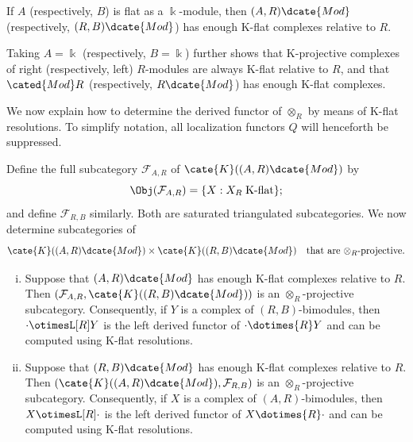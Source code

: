 \begin{corollary}\label{prop:enough-K-flat}
	If $A$ (respectively, $B$) is flat as a $\Bbbk$-module, then
	$(A,R)\dcate{Mod}$ (respectively, $(R,B)\dcate{Mod}$) has enough K-flat
	complexes relative to $R$.
\end{corollary}

Taking $A=\Bbbk$ (respectively, $B=\Bbbk$) further shows that K-projective
complexes of right (respectively, left) $R$-modules are always K-flat relative
to $R$, and that $\cated{Mod}R$ (respectively, $R\dcate{Mod}$) has enough
K-flat complexes.

We now explain how to determine the derived functor of $\otimes_R$ by means
of K-flat resolutions. To simplify notation, all localization functors $Q$
will henceforth be suppressed.

\begin{proposition}\label{prop:K-flat}
	Define the full subcategory $\mathcal{F}_{A,R}$ of
	$\cate{K}((A,R)\dcate{Mod})$ by
	\[ \Obj(\mathcal{F}_{A,R}) = \{ X: X_R \;\text{K-flat} \}; \]
	and define $\mathcal{F}_{R,B}$ similarly. Both are saturated triangulated
	subcategories. We now determine subcategories of
	\[ \cate{K}((A,R)\dcate{Mod}) \times \cate{K}((R,B)\dcate{Mod}) \quad \text{that are $\otimes_R$-projective}. \]
	\begin{enumerate}[(i)]
		\item Suppose that $(A,R)\dcate{Mod}$ has enough K-flat complexes
		relative to $R$. Then
		$\left(\mathcal{F}_{A,R},\cate{K}((R,B)\dcate{Mod})\right)$ is an
		$\otimes_R$-projective subcategory. Consequently, if $Y$ is a complex of
		$(R,B)$-bimodules, then $\cdot\otimesL[R]Y$ is the left derived functor
		of $\cdot\dotimes{R}Y$ and can be computed using K-flat resolutions.

		\item Suppose that $(R,B)\dcate{Mod}$ has enough K-flat complexes
		relative to $R$. Then
		$(\cate{K}((A,R)\dcate{Mod}),\mathcal{F}_{R,B})$ is an
		$\otimes_R$-projective subcategory. Consequently, if $X$ is a complex of
		$(A,R)$-bimodules, then $X\otimesL[R]\cdot$ is the left derived functor
		of $X\dotimes{R}\cdot$ and can be computed using K-flat resolutions.
	\end{enumerate}
\end{proposition}

